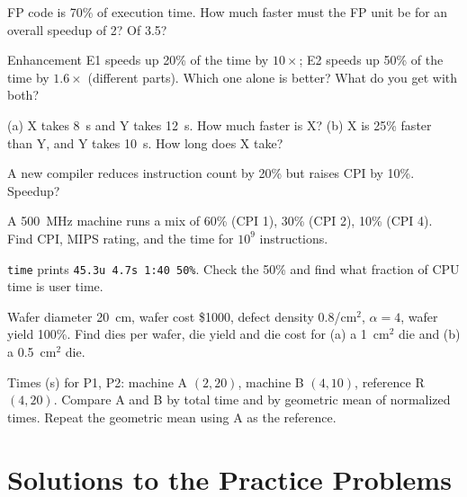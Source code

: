 \documentclass[11pt]{article}
\begin{document}
\begin{exercise}\label{p:target}
FP code is 70\% of execution time. How much faster must the FP unit be for an
overall speedup of 2? Of 3.5?
\end{exercise}

\begin{exercise}\label{p:twoenh}
Enhancement E1 speeds up 20\% of the time by $10\times$; E2 speeds up 50\% of
the time by $1.6\times$ (different parts). Which one alone is better? What do
you get with both?
\end{exercise}

\begin{exercise}\label{p:percent}
(a) X takes 8~s and Y takes 12~s. How much faster is X?
(b) X is 25\% faster than Y, and Y takes 10~s. How long does X take?
\end{exercise}

\begin{exercise}\label{p:compilerchange}
A new compiler reduces instruction count by 20\% but raises CPI by 10\%.
Speedup?
\end{exercise}

\begin{exercise}\label{p:mips}
A 500~MHz machine runs a mix of 60\% (CPI 1), 30\% (CPI 2), 10\% (CPI 4).
Find CPI, MIPS rating, and the time for $10^9$ instructions.
\end{exercise}

\begin{exercise}\label{p:unix}
\texttt{time} prints \texttt{45.3u 4.7s 1:40 50\%}. Check the 50\% and find
what fraction of CPU time is user time.
\end{exercise}

\begin{exercise}\label{p:die}
Wafer diameter 20~cm, wafer cost \$1000, defect density 0.8/cm$^2$,
$\alpha=4$, wafer yield 100\%. Find dies per wafer, die yield and die cost
for (a) a 1~cm$^2$ die and (b) a 0.5~cm$^2$ die.
\end{exercise}

\begin{exercise}\label{p:geo}
Times (s) for P1, P2: machine A $(2, 20)$, machine B $(4, 10)$, reference R
$(4, 20)$. Compare A and B by total time and by geometric mean of
normalized times. Repeat the geometric mean using A as the reference.
\end{exercise}

\section{Solutions to the Practice Problems}
\end{document}
